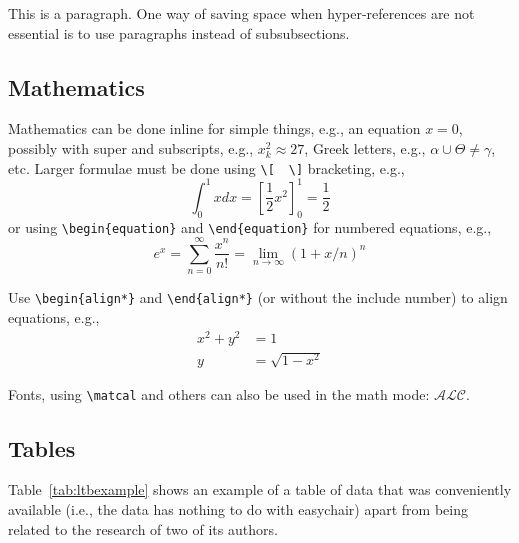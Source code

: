 \documentclass[EPiC]{easychair}
\newcommand{\easychair}{\textsf{easychair}}
\begin{document}
This is a paragraph. 
One way of saving space when hyper-references are not essential is to 
use paragraphs instead of subsubsections.

\subsection{Mathematics}
\label{sect:mathematics}

Mathematics can be done inline for simple things, e.g., an equation
$x = 0$, possibly with super and subscripts, e.g., $x^2_k \approx 27$,
Greek letters, e.g., $\alpha \cup \Theta \ne \gamma$, etc.
Larger formulae must be done using {\tt \verb|\|[}~~{\tt \verb|\|]}
bracketing, e.g.,
\[
\int_{0}^{1} x dx = \left[ \frac{1}{2}x^2 \right]_{0}^{1} = \frac{1}{2}
\]
or using {\tt \verb|\|begin\{equation\}} and {\tt \verb|\|end\{equation\}} for
numbered equations, e.g.,
\begin{equation}
e^x = \sum_{n=0}^\infty \frac{x^n}{n!} = \lim_{n\rightarrow\infty} (1+x/n)^n
\end{equation}

Use {\tt \verb|\|begin\{align*\}} and {\tt \verb|\|end\{align*\}} (or without
the {\tt *} include number) to align equations, e.g.,
\begin{align*}
x^2 + y^2 &= 1 \\
y &= \sqrt{1 - x^2}
\end{align*}

Fonts, using \verb|\matcal| and others can also be used in the math mode: $\mathcal{ALC}$.

\subsection{Tables}
\label{sect:tables}

Table~\ref{tab:ltbexample} shows an example of a table of data that was
conveniently available (i.e., the data has nothing to do with
{\easychair}) apart from being related to the research of two of its
authors. 
\end{document}
